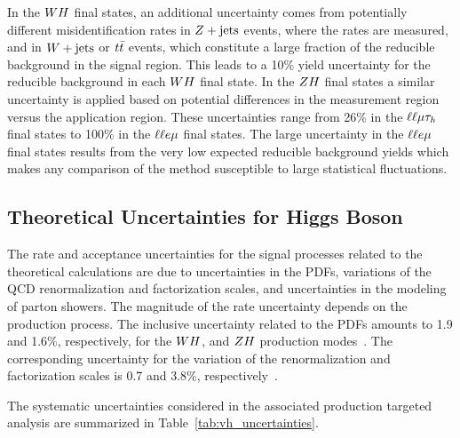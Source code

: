 In the $WH$ final states, an 
additional uncertainty comes from potentially different misidentification rates 
in $Z+\textrm{jets}$ events, where the rates are measured, and in $W+\textrm{jets}$ or 
$t\bar{t}$ events, which constitute a large fraction of the reducible background 
in the signal region. This leads to a 10\% yield uncertainty for the reducible 
background in each $WH$ final state. In the $ZH$ final
states a similar uncertainty is applied based on potential differences in the
measurement region versus the application region. These uncertainties
range from 26\% in the $\ell\ell\mu\tau_{h}$ final states to 100\% in the
$\ell\ell e\mu$ final states. The large uncertainty in the $\ell\ell e\mu$ 
final states results from the very low expected reducible background yields 
which makes any comparison of the method susceptible to large statistical fluctuations.


\subsection{Theoretical Uncertainties for Higgs Boson}
The rate and acceptance uncertainties for the signal processes related to the 
theoretical calculations are due to uncertainties in the PDFs, variations of 
the QCD renormalization and factorization scales, and uncertainties in the 
modeling of parton showers. The magnitude of the rate uncertainty depends on 
the production process.
The inclusive uncertainty related to the PDFs amounts to 1.9 and 1.6\%, 
respectively, for the $WH$, and $ZH$ production modes~\cite{deFlorian:2016spz}. The
corresponding uncertainty for the variation of the renormalization and 
factorization scales is 0.7 and 3.8\%, respectively~\cite{deFlorian:2016spz}.

The systematic uncertainties considered in the associated production
targeted analysis are summarized in Table~\ref{tab:vh_uncertainties}.


